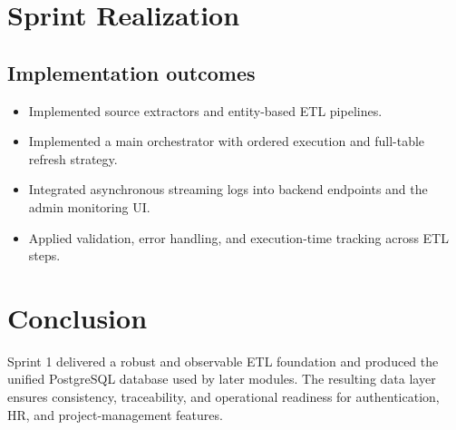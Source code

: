 \section{Sprint Realization}
\subsection{Implementation outcomes}
\begin{itemize}[noitemsep]
    \item Implemented source extractors and entity-based ETL pipelines.
    \item Implemented a main orchestrator with ordered execution and full-table refresh strategy.
    \item Integrated asynchronous streaming logs into backend endpoints and the admin monitoring UI.
    \item Applied validation, error handling, and execution-time tracking across ETL steps.
\end{itemize}

\section{Conclusion}
Sprint 1 delivered a robust and observable ETL foundation and produced the unified PostgreSQL database used by later modules. The resulting data layer ensures consistency, traceability, and operational readiness for authentication, HR, and project-management features.
